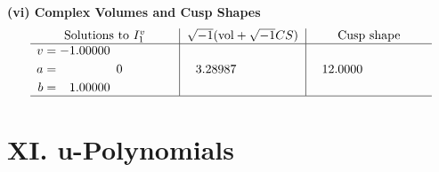 \documentclass[1p]{elsarticle_modified}
\theoremstyle{definition}
\newcommand{\I}{\sqrt{-1}}
\begin{document}
\newpage\flushleft \textbf{(vi) Complex Volumes and Cusp Shapes}
$$\begin{array}{c|c|c}  
\text{Solutions to }I^v_{1}& \I (\text{vol} + \sqrt{-1}CS) & \text{Cusp shape}\\
 \hline 
\begin{aligned}
v &= -1.00000\phantom{ +0.000000I} \\
a &= \phantom{-0.000000 } 0 \\
b &= \phantom{-}1.00000\phantom{ +0.000000I}\end{aligned}
 & \phantom{-}3.28987\phantom{ +0.000000I} & \phantom{-}12.0000\phantom{ +0.000000I}\\
 \hline 
 \end{array}$$\newpage
\newpage\renewcommand{\arraystretch}{1}
\centering \section*{ XI. u-Polynomials}
\end{document}
